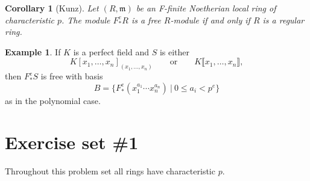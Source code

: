 \documentclass[12pt]{amsart}
\newtheorem{corollary}[theorem]{Corollary}
\theoremstyle{definition}
\newtheorem{example}[theorem]{Example}
\numberwithin{equation}{theorem}
\def\frakm{\mathfrak{m}}
\begin{document}
\begin{corollary}[Kunz]\label{corKunz}
Let $(R,\frakm)$ be an F-finite Noetherian local ring of characteristic $p$. The module $F^e_* R$ is a free $R$-module if and only if $R$ is a regular ring.
\end{corollary}

\begin{example} If $K$ is a perfect field and $S$ is either
\[ K[x_1,\dots,x_n]_{(x_1,\dots,x_n)} \qquad \text{or} \qquad  K\llbracket x_1,\dots,x_n \rrbracket,\]
then $F^e_*S$ is free with basis
\[ B= \{ F^e_*(x_1^{a_1} \cdots x_n^{a_n}) \ | \ 0\leq a_i < p^e \}\]
as in the polynomial case.
\end{example}



\newpage 

\section*{Exercise set \#1} Throughout this problem set all rings have characteristic $p$.
\end{document}
